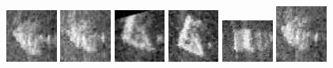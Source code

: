 \begin{figure}
    \includegraphics[width=0.15\textwidth]{chapters/images/dataset/all-class-images/drinkCarton/drinkCarton-299.jpg}
    \includegraphics[width=0.15\textwidth]{chapters/images/dataset/all-class-images/drinkCarton/drinkCarton-218.jpg}
    \includegraphics[width=0.15\textwidth]{chapters/images/dataset/all-class-images/drinkCarton/drinkCarton-175.jpg}
    \includegraphics[width=0.15\textwidth]{chapters/images/dataset/all-class-images/drinkCarton/drinkCarton-155.jpg}
    \includegraphics[width=0.15\textwidth]{chapters/images/dataset/all-class-images/drinkCarton/drinkCarton-119.jpg}
    \includegraphics[width=0.15\textwidth]{chapters/images/dataset/all-class-images/drinkCarton/drinkCarton-186.jpg}
    

\end{figure}
